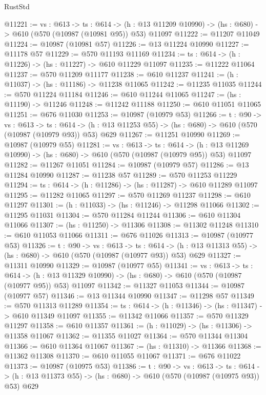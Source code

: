 \begin{lexlean}{RustStd}
\begin{coremodule}
@11221 := {vs : @613} ->
  {ts : @614} ->
  (h : @13 @11209 @10990) -> (hs : @680) -> @610 (@570 (@10987 (@10981 @95)) @53) @11097
@11222 := @11207 @11049
@11224 := @10987 (@10981 @57)
@11226 := @13 @11224 @10990
@11227 := @11178 @57
@11229 := @570 @11193 @11169
@11234 := {ts : @614} -> (h : @11226) -> (hs : @11227) -> @610 @11229 @11097
@11235 := @11222 @11064
@11237 := @570 @11209 @11177
@11238 := @610 @11237
@11241 := (h : @11037) -> (hs : @11186) -> @11238 @11065
@11242 := @11235 @11035
@11244 := @570 @11224 @11184
@11246 := @610 @11244 @11065
@11247 := (hs : @11190) -> @11246
@11248 := @11242 @11188
@11250 := @610 @11051 @11065
@11251 := @676 @11030
@11253 := @10987 (@10979 @53)
@11266 := {t : @90} ->
  {vs : @613} ->
  {ts : @614} -> (h : @13 @11253 @55) -> (hs : @680) -> @610 (@570 (@10987 (@10979 @93)) @53) @629
@11267 := @11251 @10990
@11269 := @10987 (@10979 @55)
@11281 := {vs : @613} ->
  {ts : @614} ->
  (h : @13 @11269 @10990) -> (hs : @680) -> @610 (@570 (@10987 (@10979 @95)) @53) @11097
@11282 := @11267 @11051
@11284 := @10987 (@10979 @57)
@11286 := @13 @11284 @10990
@11287 := @11238 @57
@11289 := @570 @11253 @11229
@11294 := {ts : @614} -> (h : @11286) -> (hs : @11287) -> @610 @11289 @11097
@11295 := @11282 @11065
@11297 := @570 @11269 @11237
@11298 := @610 @11297
@11301 := (h : @11033) -> (hs : @11246) -> @11298 @11066
@11302 := @11295 @11031
@11304 := @570 @11284 @11244
@11306 := @610 @11304 @11066
@11307 := (hs : @11250) -> @11306
@11308 := @11302 @11248
@11310 := @610 @11053 @11066
@11311 := @676 @11026
@11313 := @10987 (@10977 @53)
@11326 := {t : @90} ->
  {vs : @613} ->
  {ts : @614} -> (h : @13 @11313 @55) -> (hs : @680) -> @610 (@570 (@10987 (@10977 @93)) @53) @629
@11327 := @11311 @10990
@11329 := @10987 (@10977 @55)
@11341 := {vs : @613} ->
  {ts : @614} ->
  (h : @13 @11329 @10990) -> (hs : @680) -> @610 (@570 (@10987 (@10977 @95)) @53) @11097
@11342 := @11327 @11053
@11344 := @10987 (@10977 @57)
@11346 := @13 @11344 @10990
@11347 := @11298 @57
@11349 := @570 @11313 @11289
@11354 := {ts : @614} -> (h : @11346) -> (hs : @11347) -> @610 @11349 @11097
@11355 := @11342 @11066
@11357 := @570 @11329 @11297
@11358 := @610 @11357
@11361 := (h : @11029) -> (hs : @11306) -> @11358 @11067
@11362 := @11355 @11027
@11364 := @570 @11344 @11304
@11366 := @610 @11364 @11067
@11367 := (hs : @11310) -> @11366
@11368 := @11362 @11308
@11370 := @610 @11055 @11067
@11371 := @676 @11022
@11373 := @10987 (@10975 @53)
@11386 := {t : @90} ->
  {vs : @613} ->
  {ts : @614} -> (h : @13 @11373 @55) -> (hs : @680) -> @610 (@570 (@10987 (@10975 @93)) @53) @629

\end{coremodule}
\end{lexlean}
